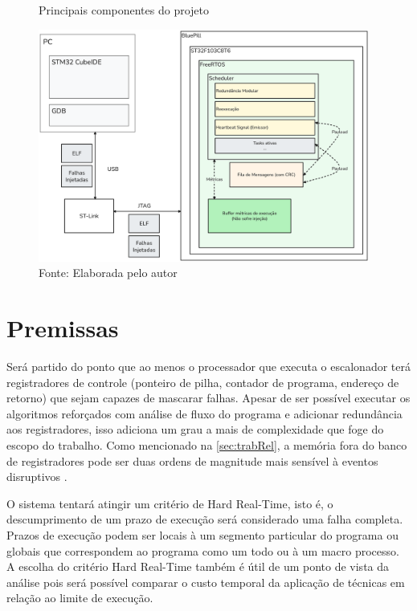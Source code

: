\begin{figure}[H]
    \centering
    \captionsetup{justification=centering}
    \caption{Principais componentes do projeto}
    \includegraphics[width=0.97\textwidth]{assets/visao_geral.png}
    \captionsetup{justification=raggedright}
    \caption*{Fonte: Elaborada pelo autor}
    \label{fig:visaoGeral}
\end{figure}

\section{Premissas}

Será partido do ponto que ao menos o processador que executa o escalonador terá registradores de controle (ponteiro de pilha, contador de programa, endereço de retorno) que sejam capazes de mascarar falhas. Apesar de ser possível executar os algoritmos reforçados com análise de fluxo do programa e adicionar redundância aos registradores, isso adiciona um grau a mais de complexidade que foge do escopo do trabalho. Como mencionado na \autoref{sec:trabRel}, a memória fora do banco de registradores pode ser duas ordens de magnitude mais sensível à eventos disruptivos \cite{ReliabilityArmCortexUnderHeavyIons}.

O sistema tentará atingir um critério de Hard Real-Time, isto é, o descumprimento de um prazo de execução será considerado uma falha completa. Prazos de execução podem ser locais à um segmento particular do programa ou globais que correspondem ao programa como um todo ou à um macro processo. A escolha do critério Hard Real-Time também é útil de um ponto de vista da análise pois será possível comparar o custo temporal da aplicação de técnicas em relação ao limite de execução.


